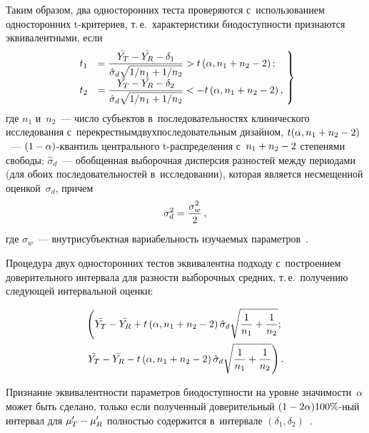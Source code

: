 \begin{multicols}{2}
Таким образом, два односторонних теста проверяются с~использованием односторонних 
t-кри\-те\-ри\-ев, т.\,е.\ 
характеристики биодоступности признаются эквивалентными, если
\begin{equation}
\left.
\begin{array}{rl}
    \hspace*{-2mm}t_1& =  \fr{\bar{Y_T} -\bar{Y_R}-\delta_1}
    {\hat\sigma_d\sqrt{{1}/{n_1} + {1}/{n_2}}} > t\left(\alpha, n_1 + n_2-2\right); \\[6pt]
        \hspace*{-2mm}t_2& =  \fr{\bar{Y_T} - \bar{Y_R}-\delta_2}
    {\hat\sigma_d\sqrt{{1}/{n_1} + {1}/{n_2}}} < -t\left(\alpha, n_1 + n_2-2\right), 
    \end{array}\!
    \right\}\!\!
    \label{t}
\end{equation}
где $n_1$ и~$n_2$~--- число субъектов в~последовательностях клинического 
исследования с~перекрестным\linebreak двухпоследовательным дизайном, 
$t(\alpha, n_1\hm + n_2-2)$~--- $(1\hm - \alpha)$-кван\-тиль центрального 
t-рас\-пре\-де\-ле\-ния с~$n_1\hm+n_2-2$ степенями свободы; $\hat\sigma_d$~--- 
обобщенная выборочная дисперсия разностей между периодами (для обоих 
последовательностей в~исследовании), которая является несмещенной оценкой~$\sigma_d$,\linebreak 
причем
$$
\sigma_d^2 = \displaystyle\frac{\displaystyle \sigma_w^2\mathstrut}{\displaystyle 2\mathstrut}\,,
$$
где $\sigma_w$~--- внутрисубъектная вариабельность изуча\-емых параметров~\cite{article}.

Процедура двух односторонних тестов эквивалентна подходу с~построением 
доверительного интервала для разности выборочных средних, т.\,е.\ 
получению следующей интервальной оценки:

\noindent
\begin{multline*}
    \left(\bar{Y_T} - \bar{Y_R} + t\left(\alpha, n_1 + n_2-2\right)\hat\sigma_d
    \sqrt{\displaystyle\frac{\displaystyle 1\mathstrut}{\displaystyle n_1\mathstrut} + \displaystyle\frac{\displaystyle 1\mathstrut}{\displaystyle n_2\mathstrut}};\right.\\
    \left.   \bar{Y_T} - \bar{Y_R} - t\left(\alpha, n_1 + n_2-2\right)
    \hat\sigma_d\sqrt{\displaystyle\frac{\displaystyle 1\mathstrut}{\displaystyle n_1\mathstrut} + \displaystyle\frac{\displaystyle 1\mathstrut}{\displaystyle n_2\mathstrut}}\right).
\end{multline*}

Признание эквивалентности параметров биодоступности на
 уровне значимости~$\alpha$ может быть сделано, только если 
 полученный доверительный $(1\hm-2\alpha)100\%$-ный интервал для 
 $\mu'_T \hm- \mu'_R$ полностью содержится в~интервале 
 $\left(\delta_1, \delta_2\right)$~\cite{schuirmann}.



\end{multicols}
